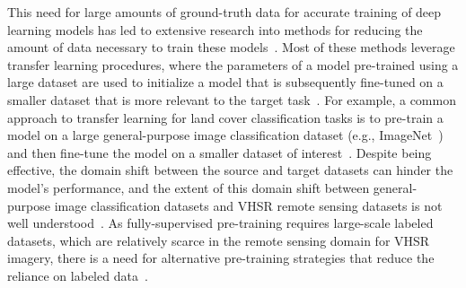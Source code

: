 This need for large amounts of ground-truth data for accurate training of deep learning models has led to extensive research into methods for reducing the amount of data necessary to train these models~\citep{wurmSemanticSegmentationSlums2019,tuiaDomainAdaptationClassification2016, martinsDeepLearningHigh2022}.
Most of these methods leverage transfer learning procedures, where the parameters of a model pre-trained using a large dataset are used to initialize a model that is subsequently fine-tuned on a smaller dataset that is more relevant to the target task~\citep{weissSurveyTransferLearning2016, zhuangComprehensiveSurveyTransfer2021}.
For example, a common approach to transfer learning for land cover classification tasks is to pre-train a model on a large general-purpose image classification dataset (e.g., ImageNet~\citep{russakovskyImageNetLargeScale2015}) and then fine-tune the model on a smaller dataset of interest~\citep{piresdelimaConvolutionalNeuralNetwork2020,marmanisDeepLearningEarth2016,nogueiraBetterExploitingConvolutional2017, zouTransferLearningClassification2018}. 
Despite being effective, the domain shift between the source and target datasets can hinder the model's performance, and the extent of this domain shift between general-purpose image classification datasets and VHSR remote sensing datasets is not well understood~\citep{maTransferLearningEnvironmental2024}.
As fully-supervised pre-training requires large-scale labeled datasets, which are relatively scarce in the remote sensing domain for VHSR imagery, there is a need for alternative pre-training strategies that reduce the reliance on labeled data~\citep{wangEmpiricalStudyRemote2023, xuSelfsupervisedPretrainingLargescale2024}.



